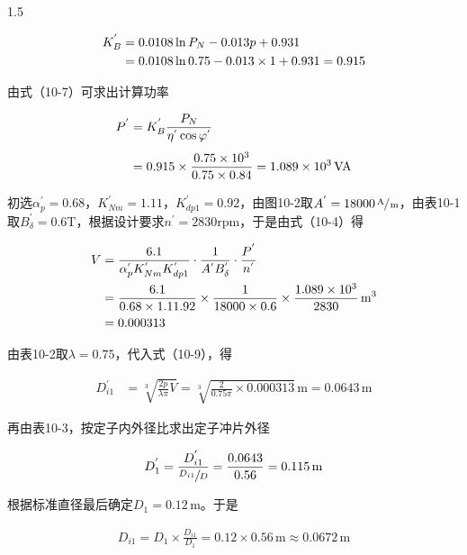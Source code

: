 \documentclass[a4paper,11pt]{ctexart}
\newcommand{\A}{\,\text{A}}
\newcommand{\VA}{\,\text{VA}}
\newcommand{\m}{\,\text{m}}
\newcommand{\rpm}{\text{rpm}}
\newcommand{\T}{\text{T}}
\newenvironment{shrinkeq}[2]
{
	\bgroup
	\addtolength\abovedisplayshortskip{#1}
	\addtolength\abovedisplayskip{#1}
	\addtolength\belowdisplayshortskip{#2}
	\addtolength\belowdisplayskip{#2}
}
{
	\egroup
	\ignorespacesafterend
}
\begin{document}
\begin{spacing}{1.5}
\begin{shrinkeq}{-1.5ex}{-1.5ex}
\begin{align}
	K_{B}^{'} &= 0.0108\ln P_N - 0.013p +0.931 \\
	&= 0.0108\ln 0.75 - 0.013\times 1 +0.931 = 0.915 \notag
	\end{align}
\end{shrinkeq}
\par
由式（10-7）可求出计算功率
\begin{shrinkeq}{-1.5ex}{-1ex}
	\begin{align}
	P^{'} &= K_{B}^{'}\frac{P_N}{\eta^{'}\cos\varphi^{'}} \\[1.5mm]
	&= 0.915\times\frac{0.75\times 10^3}{0.75\times 0.84} = 1.089\times 10^3 \VA\notag
	\end{align}
\end{shrinkeq}
\par
初选$\alpha_{p}^{'} = 0.68$，$K_{Nm}^{'} = 1.11$，$K_{dp1}^{'} = 0.92$，由图10-2取$A^{'} =18000\sfrac{\A}{\m}$，由表10-1取$B_{\delta}^{'} = 0.6\T$，根据设计要求$n^{'}=2830\rpm$，于是由式（10-4）得
\begin{shrinkeq}{-1.5ex}{-1.5ex}
	\begin{align}
	V &= \frac{6.1}{\alpha_{p}^{'}K_{Nm}^{'}K_{dp1}^{'}}\cdot\frac{1}{A^{'}B_{\delta}^{'}}\cdot\frac{P^{'}}{n^{'}} \\
	&=\frac{6.1}{0.68\times 1.11\time 0.92}\times\frac{1}{18000\times 0.6}\times\frac{1.089\times 10^3}{2830}\m^3 \notag\\
	&=0.000313 \notag
	\end{align}
\end{shrinkeq}
\par
由表10-2取$\lambda = 0.75$，代入式（10-9），得
\begin{shrinkeq}{-1ex}{-1ex}
	\begin{align}
	D_{i1}^{'} &= \sqrt[3]{\frac{2p}{\lambda\pi}V}=\sqrt[3]{\frac{2}{0.75\pi}\times 0.000313}\m = 0.0643\m 
	\end{align}
\end{shrinkeq}
再由表10-3，按定子内外径比求出定子冲片外径
\begin{shrinkeq}{-1.5ex}{-1.5ex}
	\begin{align}
	D_{1}^{'} = \frac{D_{i1}^{'}}{\sfrac{D_{i1}}{D}} = \frac{0.0643}{0.56}  = 0.115\m
	\end{align}
\end{shrinkeq}
\par
根据标准直径最后确定$D_1 = 0.12\m$。于是
\begin{shrinkeq}{-1.5ex}{-1.5ex}
	\begin{align}
	D_{i1} = D_1\times\frac{D_{i1}}{D_1} = 0.12\times 0.56\m  \approx 0.0672\m

\end{align}
\end{shrinkeq}
\end{spacing}
\end{document}
